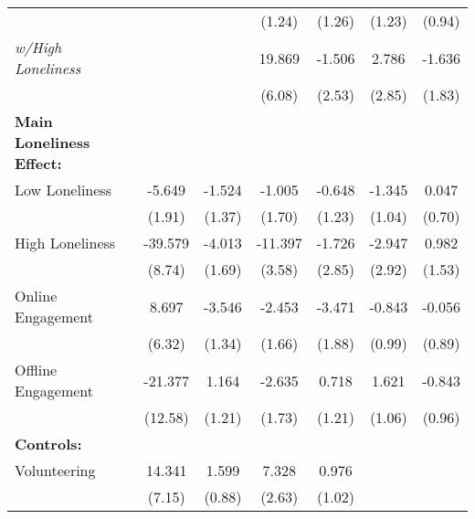 \begin{table}[htbp]
\begin{tabular}{l*{6}{c}}
                              &             &             &(1.24)        &(1.26)        &(1.23)        &(0.94)        \\
\hspace{0.5cm} \emph{w/High Loneliness}&             &             &19.869\sym{**}&-1.506        &2.786        &-1.636        \\
                              &             &             &(6.08)        &(2.53)        &(2.85)        &(1.83)        \\
\midrule \textbf{Main Loneliness Effect:}&             &             &             &             &             &             \\
\hspace{0.25cm} Low Loneliness&-5.649\sym{**}&-1.524        &-1.005        &-0.648        &-1.345        &0.047        \\
                              &(1.91)        &(1.37)        &(1.70)        &(1.23)        &(1.04)        &(0.70)        \\
\hspace{0.25cm} High Loneliness&-39.579\sym{**}&-4.013\sym{*} &-11.397\sym{**}&-1.726        &-2.947        &0.982        \\
                              &(8.74)        &(1.69)        &(3.58)        &(2.85)        &(2.92)        &(1.53)        \\
\hspace{0.25cm} Online Engagement&8.697        &-3.546\sym{*} &-2.453        &-3.471\sym{^+}&-0.843        &-0.056        \\
                              &(6.32)        &(1.34)        &(1.66)        &(1.88)        &(0.99)        &(0.89)        \\
\hspace{0.25cm} Offline Engagement&-21.377        &1.164        &-2.635        &0.718        &1.621        &-0.843        \\
                              &(12.58)        &(1.21)        &(1.73)        &(1.21)        &(1.06)        &(0.96)        \\
\textbf{Controls:}            &             &             &             &             &             &             \\
\hspace{0.25cm} Volunteering  &14.341\sym{^+}&1.599\sym{^+}&7.328\sym{*} &0.976        &             &             \\
                              &(7.15)        &(0.88)        &(2.63)        &(1.02)        &             &             \\

\end{tabular}
\end{table}
